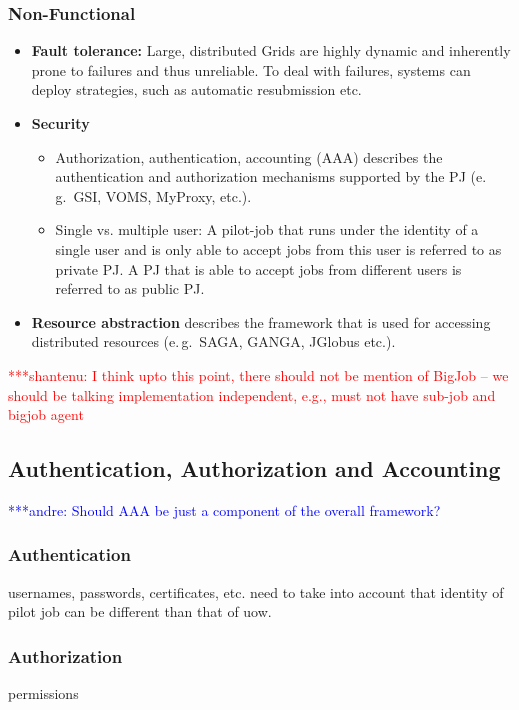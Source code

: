 \documentclass[]{article}
\newcommand{\jhanote}[1]{ {\textcolor{red} { ***shantenu: #1 }}}
\newcommand{\alnote}[1]{ {\textcolor{blue} { ***andre: #1 }}}
\newcommand{\alnote}[1]{}
\newcommand{\jhanote}[1]{}
\begin{document}
\subsubsection{Non-Functional}

\begin{itemize}
	\item \textbf{Fault tolerance:} Large, distributed Grids are highly dynamic 
	and inherently prone to failures and thus unreliable. To deal with failures, 
	systems can deploy strategies, such as automatic resubmission etc.
	\item \textbf{Security}
	\begin{itemize}
       \item Authorization, authentication, accounting (AAA) describes the 
       authentication and authorization mechanisms supported by the PJ (e.\,g.\  
       GSI, VOMS, MyProxy, etc.). 
	   \item Single vs. multiple user: A pilot-job that runs under the identity 
	   of a single user and is only able to accept jobs from this user is 
	   referred to as private PJ. A PJ that is able to accept jobs from 
	   different users is referred to as public PJ.
	\end{itemize}
	\item \textbf{Resource abstraction} describes the framework that is used for accessing distributed resources (e.\,g.\ SAGA, GANGA, JGlobus etc.).
\end{itemize}

\jhanote{I think upto this point, there should not be mention of
  BigJob -- we should be talking implementation independent, e.g., must
  not have sub-job and bigjob agent}


\subsection{Authentication, Authorization and Accounting}
\alnote{Should AAA be just a component of the overall framework?}

\subsubsection{Authentication}
usernames, passwords, certificates, etc.
need to take into account that identity of pilot job can be different than that of uow.

\subsubsection{Authorization}
permissions
\end{document}
